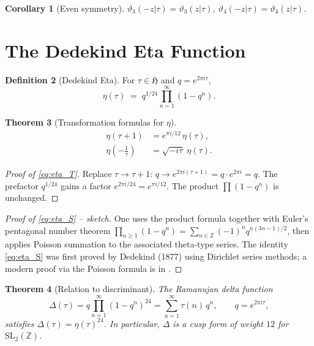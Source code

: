 \documentclass[12pt,a4paper]{amsart}
\newtheorem{theorem}{Theorem}[section]
\newtheorem{corollary}[theorem]{Corollary}
\theoremstyle{definition}
\newtheorem{definition}[theorem]{Definition}
\begin{document}
\begin{corollary}[Even symmetry]\label{cor:even}
$\vartheta_3(-z|\tau) = \vartheta_3(z|\tau)$, \quad
$\vartheta_4(-z|\tau) = \vartheta_4(z|\tau)$.
\end{corollary}

\section{The Dedekind Eta Function}\label{sec:eta}

\begin{definition}[Dedekind Eta]\label{def:eta}
For $\tau \in \mathfrak{H}$ and $q = e^{2\pi i\tau}$,
\[
  \eta(\tau) \;=\; q^{1/24}\prod_{n=1}^{\infty}(1-q^n).
\]
\end{definition}

\begin{theorem}[Transformation formulas for $\eta$]\label{thm:eta_transform}
\begin{align}
  \eta(\tau+1) &= e^{\pi i/12}\,\eta(\tau),\label{eq:eta_T}\\
  \eta\!\left(-\tfrac{1}{\tau}\right) &= \sqrt{-i\tau}\;\eta(\tau).\label{eq:eta_S}
\end{align}
\end{theorem}

\begin{proof}[Proof of \eqref{eq:eta_T}]
Replace $\tau \to \tau+1$: $q \to e^{2\pi i(\tau+1)} = q\cdot e^{2\pi i} = q$.
The prefactor $q^{1/24}$ gains a factor $e^{2\pi i/24} = e^{\pi i/12}$.
The product $\prod(1-q^n)$ is unchanged.
\end{proof}

\begin{proof}[Proof of \eqref{eq:eta_S} -- sketch]
One uses the product formula together with Euler's pentagonal number theorem
$\prod_{n\geq1}(1-q^n) = \sum_{n\in\mathbb{Z}}(-1)^n q^{n(3n-1)/2}$,
then applies Poisson summation to the associated theta-type series.
The identity \eqref{eq:eta_S} was first proved by Dedekind (1877) using
Dirichlet series methods; a modern proof via the Poisson formula is in \cite{Apostol1990}.
\end{proof}

\begin{theorem}[Relation to discriminant]\label{thm:delta}
The Ramanujan delta function
\[
  \Delta(\tau) = q\prod_{n=1}^{\infty}(1-q^n)^{24} = \sum_{n=1}^{\infty}\tau(n)\,q^n,
  \qquad q = e^{2\pi i\tau},
\]
satisfies $\Delta(\tau) = \eta(\tau)^{24}$.
In particular, $\Delta$ is a cusp form of weight $12$ for $\mathrm{SL}_2(\mathbb{Z})$.
\end{theorem}
\end{document}
